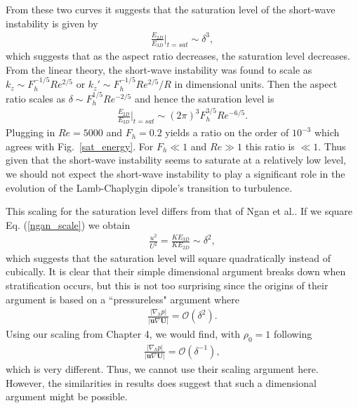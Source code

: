 From these two curves it suggests that the saturation level of the short-wave instability is given by
\begin{align}
\frac{E_{2D}}{E_{3D}}\bigg|_{t=sat} \sim \delta^{3},
\end{align}
which suggests that as the aspect ratio decreases, the saturation level decreases. From the linear theory, the short-wave instability was found to scale as $k_{z}\sim F_{h}^{-1/5}Re^{2/5}$ or $k_{z}'\sim F_{h}^{-1/5}Re^{2/5}/R$ in dimensional units. Then the aspect ratio scales as $\delta \sim F_{h}^{1/5}Re^{-2/5}$ and hence the saturation level is 
\begin{align}
\frac{E_{2D}}{E_{3D}}\bigg|_{t=sat} \sim (2\pi)^{3}F_{h}^{3/5}Re^{-6/5}.
\end{align}
Plugging in $Re=5000$ and $F_{h}=0.2$ yields a ratio on the order of $10^{-3}$ which agrees with Fig.~\ref{sat_energy}. For $F_{h}\ll 1$ and $Re\gg 1$ this ratio is $\ll 1$. Thus given that the short-wave instability seems to saturate at a relatively low level, we should not expect the short-wave instability to play a significant role in the evolution of the Lamb-Chaplygin dipole's transition to turbulence. 

This scaling for the saturation level differs from that of Ngan et al.\cite{ngan2005}. If we square Eq. (\ref{ngan_scale}) we obtain 
\begin{align}
\frac{u^{2}}{U^{2}} =\frac{KE_{3D}}{KE_{2D}}\sim \delta^{2},
\end{align}
which suggests that the saturation level will square quadratically instead of cubically. It is clear that their simple dimensional argument breaks down when stratification occurs, but this is not too surprising since the origins of their argument \cite{ngan2004} is based on a ``pressureless" argument where 
\begin{align}
\frac{|\nabla_{h}p|}{|\bm{u}\nabla\bm{U}|}= \mathcal{O}(\delta^{2}).
\end{align}
Using our scaling from Chapter 4, we would find, with $\rho_{0}=1$ following \cite{ngan2004}
\begin{align}
\frac{|\nabla_{h}p|}{|\bm{u}\nabla\bm{U}|}= \mathcal{O}(\delta^{-1}),
\end{align}
which is very different. Thus, we cannot use their scaling argument here. However, the similarities in results does suggest that such a dimensional argument might be possible.

